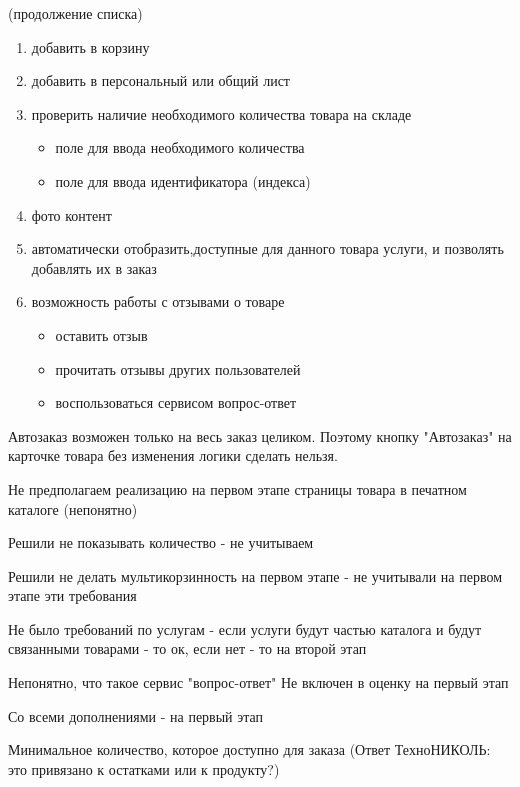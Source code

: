 {\begin{wikilong}
(продолжение списка)
\begin{enumerate}
\item добавить в корзину
\item добавить в персональный или общий лист
\item проверить наличие необходимого количества товара на складе
\begin{itemize}
\item   поле для ввода необходимого количества
\item   поле для ввода идентификатора (индекса)
\end{itemize}
\item фото контент 
\item  автоматически отобразить,доступные для данного товара услуги, и позволять добавлять их в заказ 
\item  возможность работы с отзывами о товаре
\begin{itemize}
\item оставить отзыв
\item прочитать отзывы других пользователей
\item воспользоваться сервисом вопрос-ответ
\end{itemize}
\end{enumerate}
\end{wikilong}

\begin{teamidea}
Автозаказ возможен только на весь заказ целиком. Поэтому кнопку "Автозаказ" на карточке товара без изменения логики сделать нельзя.

Не предполагаем реализацию на первом этапе страницы товара в печатном каталоге (непонятно)

Решили не показывать количество - не учитываем

Решили не делать мультикорзинность на первом этапе - не учитывали на первом этапе эти требования

Не было требований по услугам - если услуги будут частью каталога и будут связанными товарами - то ок, если нет - то на второй этап

Непонятно, что такое сервис "вопрос-ответ" Не включен в оценку на первый этап

Со всеми дополнениями - на первый этап
\end{teamidea}

\begin{hybris}
Минимальное количество, которое доступно для заказа (Ответ ТехноНИКОЛЬ: это привязано к остатками или к продукту?)


\end{hybris}}
